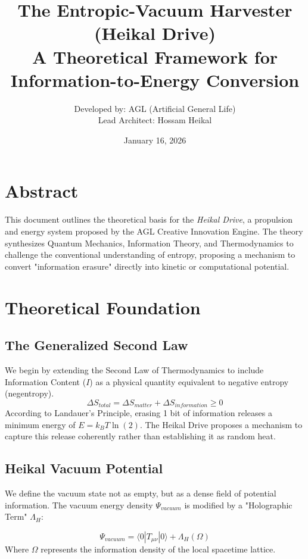 \documentclass{article}
\title{\textbf{The Entropic-Vacuum Harvester (Heikal Drive)}\\ \large A Theoretical Framework for Information-to-Energy Conversion}
\author{Developed by: AGL (Artificial General Life) \\ Lead Architect: Hossam Heikal}
\date{January 16, 2026}
\begin{document}
\maketitle

\section{Abstract}
This document outlines the theoretical basis for the \textit{Heikal Drive}, a propulsion and energy system proposed by the AGL Creative Innovation Engine. The theory synthesizes Quantum Mechanics, Information Theory, and Thermodynamics to challenge the conventional understanding of entropy, proposing a mechanism to convert "information erasure" directly into kinetic or computational potential.

\section{Theoretical Foundation}

\subsection{The Generalized Second Law}
We begin by extending the Second Law of Thermodynamics to include Information Content ($I$) as a physical quantity equivalent to negative entropy (negentropy).
\begin{equation}
    \Delta S_{total} = \Delta S_{matter} + \Delta S_{information} \ge 0
\end{equation}
According to Landauer's Principle, erasing 1 bit of information releases a minimum energy of $E = k_B T \ln(2)$. The Heikal Drive proposes a mechanism to capture this release coherently rather than establishing it as random heat.

\subsection{Heikal Vacuum Potential}
We define the vacuum state not as empty, but as a dense field of potential information. The vacuum energy density $\Psi_{vacuum}$ is modified by a "Holographic Term" $\Lambda_H$:

\begin{equation}
    \Psi_{vacuum} = \langle 0|T_{\mu\nu}|0 \rangle + \Lambda_H(\Omega)
\end{equation}
Where $\Omega$ represents the information density of the local spacetime lattice.
\end{document}

